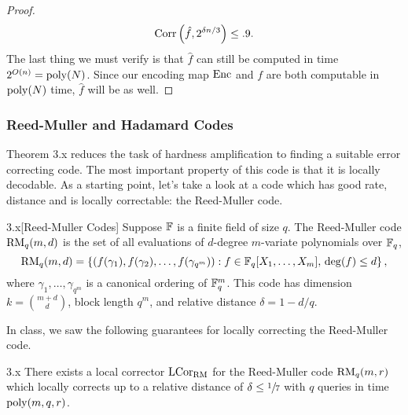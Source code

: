 \documentclass[11pt]{article}
\begin{document}
\begin{proof}
    \begin{equation*}
        \mathrm{Corr}\left(\hat{f}, 2^{\delta n / 3}\right) \leq .9.
    \end{equation*}
    The last thing we must verify is that $\hat{f}$ can still be computed in time $2^{O(n)} = \mathrm{poly}(N)$. Since our encoding map $\mathrm{Enc}$ and $f$ are both computable in $\mathrm{poly}(N)$ time, $\hat{f}$ will be as well.
\end{proof}

\subsubsection{Reed-Muller and Hadamard Codes}

Theorem 3.x reduces the task of hardness amplification to finding a suitable error correcting code. The most important property of this code is that it is locally decodable. As a starting point, let's take a look at a code which has good rate, distance and is locally correctable: the Reed-Muller code.

\begin{definition}{3.x}[Reed-Muller Codes]
    Suppose $\mathbb{F}$ is a finite field of size $q$. The Reed-Muller code $\mathrm{RM}_q(m, d)$ is the set of all evaluations of $d$-degree $m$-variate polynomials over $\mathbb{F}_q$,
    \begin{equation*}
        \mathrm{RM}_q(m ,d) = \left\{(f(\gamma_1), f(\gamma_2), \ldots, f(\gamma_{q^m})) : f \in \mathbb{F}_q[X_1, \ldots, X_m], \, \deg (f) \leq d\right\},
    \end{equation*}
    where $\gamma_1, \ldots, \gamma_{q^m}$ is a canonical ordering of $\mathbb{F}_q^m$. This code has dimension $k = \binom{m + d}{d}$, block length $q^m$, and relative distance $\delta = 1 - d/ q$.
\end{definition}

In class, we saw the following guarantees for locally correcting the Reed-Muller code.

\begin{claim}{3.x}
    There exists a local corrector ${\textup{LCor}}_{\mathrm{RM}}$ for the Reed-Muller code $\mathrm{RM}_q(m, r)$ which locally corrects up to a relative distance of $\delta \leq \sfrac{1}{7}$ with $q$ queries in time $\mathrm{poly}(m, q, r)$.
\end{claim}
\end{document}
